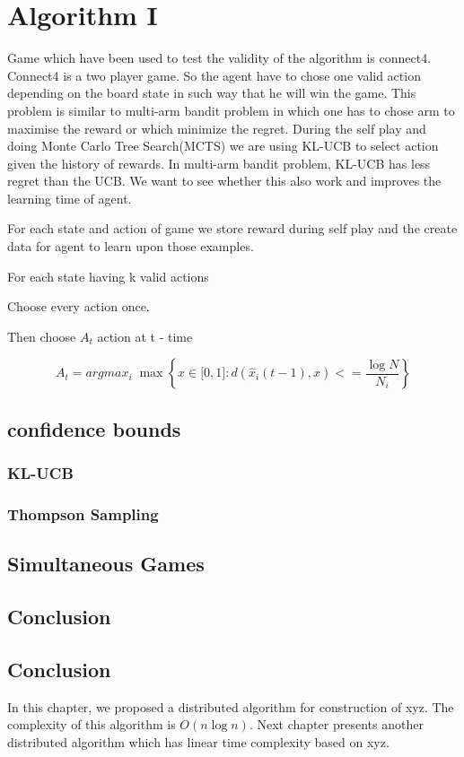 \chapter{Algorithm I}
Game which have been used to test the validity of the algorithm is connect4. Connect4 is a two player game. 
So the agent have to chose one valid action depending on the board state in such way that he will win the game. This problem is similar to multi-arm bandit problem in which one has to chose arm to maximise the reward or which minimize the regret. During the self play and doing Monte Carlo Tree Search(MCTS) we are using KL-UCB to select action given the history of rewards. In multi-arm bandit problem, KL-UCB has less regret than the UCB. We want to see whether this also work and improves the learning time of agent.

For each state and action of game we store reward during self play and the create data for agent to learn upon those examples.
 \begin{steps}
  \item For each state having k valid actions
  \item Choose every action once.
  \item Then choose $A_{t}$ action at t - time
	   
$$ A_{t} = argmax_{i}\; \max \left \lbrace x  \in \lbrack 0,1 \rbrack  : d(\hat{x}_{i}(t-1), x) <=  \dfrac{\log N}{N_{i}} \right \rbrace  $$



\end{steps}



 
\section{confidence bounds}
\subsection{KL-UCB}

\subsection{Thompson Sampling}


\section{Simultaneous Games}

\section{Conclusion}

	

\section{Conclusion}
In this chapter, we proposed a distributed algorithm
for construction of xyz.
The complexity of this algorithm is $O(n \log n)$.
Next chapter presents
another distributed algorithm which has linear time 
complexity based on xyz.

